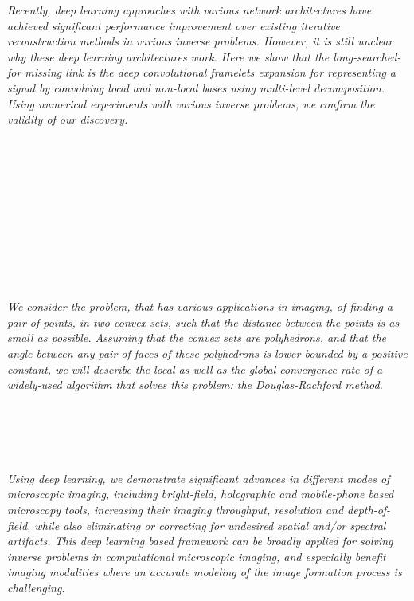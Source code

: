 \begin{multicols}{2}
\\ 
        \\
        \\\\
\\
      \textit{Recently, deep learning approaches with various network architectures have achieved significant performance improvement over existing iterative reconstruction methods in various inverse problems. However,   it is still unclear  why these deep learning architectures work.  Here we show that  the long-searched-for missing link is the deep convolutional framelets expansion for representing a signal by convolving local and non-local bases using multi-level decomposition. Using numerical experiments with various inverse problems,  we confirm the validity of our discovery.}\\
\\ 
        \\
        \\\\
        \\
        \\\\
        \\
        \\\\
\\
      \textit{We consider the problem, that has various applications in imaging, of finding a pair of points, in two convex sets, such that the distance between the points is as small as possible. Assuming that the convex sets are polyhedrons, and that the angle between any pair of faces of these polyhedrons is lower bounded by a positive constant, we will describe the local as well as the global convergence rate of a widely-used algorithm that solves this problem: the Douglas-Rachford method.}\\
\\ 
        \\
        \\\\
\\
      \textit{Using deep learning, we demonstrate significant advances in different modes of microscopic imaging, including bright-field, holographic and mobile-phone based microscopy tools, increasing their imaging throughput, resolution and depth-of-field, while also eliminating or correcting for undesired spatial and/or spectral artifacts. This deep learning based framework can be broadly applied for solving inverse problems in computational microscopic imaging, and especially benefit imaging modalities where an accurate modeling of the image formation process is challenging.}\\

\end{multicols}
